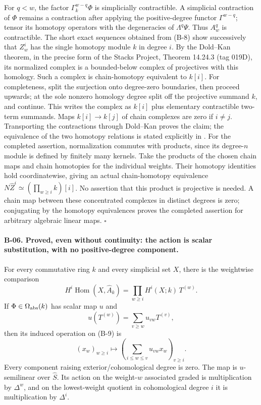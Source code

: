 For $q<w$, the factor $\Gamma_k^{w-q}\Phi$ is simplicially
contractible. A simplicial contraction of $\Phi$ remains a
contraction after applying the positive-degree functor $\Gamma^{w-q}$;
tensor its homotopy operators with the degeneracies of
$\Lambda^q\Psi$. Thus $A_w^q$ is contractible.
The short exact sequences obtained from (B-8) show successively
that $Z_w^i$ has the single homotopy module $k$ in degree $i$.
By the Dold--Kan theorem, in the precise form of the Stacks Project,
Theorem 14.24.3 (tag 019D), its normalized complex is a bounded-below
complex of projectives with this homology.
Such a complex is chain-homotopy equivalent to $k[i]$.
For completeness, split the surjection onto degree-zero boundaries,
then proceed upwards; at the sole nonzero homology degree split off
the projective summand $k$, and continue. This writes the complex as
$k[i]$ plus elementary contractible two-term summands. Maps
$k[i]\to k[j]$ of chain complexes are zero if $i\ne j$.
Transporting the contractions through Dold--Kan proves the claim;
the equivalence of the two homotopy relations is stated explicitly
in \cite[Theorem~3.31, p.~225]{BDoldPuppe1961}.
For the completed assertion, normalization commutes with products,
since its degree-$n$ module is defined by finitely many kernels.
Take the products of the chosen chain maps and chain homotopies
for the individual weights. Their homotopy identities hold
coordinatewise, giving an actual chain-homotopy equivalence
$N\widehat Z^i\simeq(\prod_{w\geq i}k)[i]$.
No assertion that this product is projective is needed. A chain
map between these concentrated complexes in distinct degrees is
zero; conjugating by the homotopy equivalences proves the
completed assertion for arbitrary algebraic linear maps.
\hfill$\square$

\paragraph{B-06. Proved, even without continuity: the action is scalar
substitution, with no positive-degree component.}
For every commutative ring $k$ and every simplicial set $X$, there is
the weightwise comparison
\[
 H^i\operatorname{Hom}(X,\widehat A_k)
   =\prod_{w\geq i}H^i(X;k)\,T^{(w)}.
 \tag{B-9}
\]
If $\Phi\in\Omega_{\rm abs}(k)$ has scalar map $u$ and
\[
 u(T^{(w)})=\sum_{v\geq w}u_{vw}T^{(v)},
\]
then its induced operation on (B-9) is
\[
 (x_w)_{w\geq i}\longmapsto
       \left(\sum_{i\leq w\leq v}u_{vw}x_w\right)_{v\geq i}.
 \tag{B-10}
\]
Every component raising exterior/cohomological degree is zero.
The map is $u$-semilinear over $\widehat S$. Its action on the
weight-$w$ associated graded is multiplication by $\Delta^w$,
and on the lowest-weight quotient in cohomological degree $i$
it is multiplication by $\Delta^i$.

